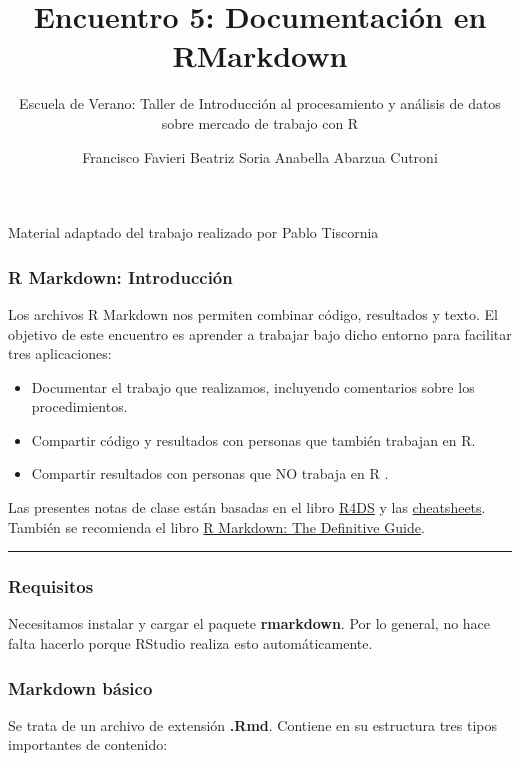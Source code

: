 \documentclass[
]{article}
\title{Encuentro 5: Documentación en RMarkdown}
\subtitle{Escuela de Verano: Taller de Introducción al procesamiento y
análisis de datos sobre mercado de trabajo con R}
\author{Francisco Favieri \textbar{} Beatriz Soria \textbar{} Anabella
Abarzua Cutroni}
\date{}
\providecommand{\tightlist}{%
  \setlength{\itemsep}{0pt}\setlength{\parskip}{0pt}}
\begin{document}
\maketitle

{
\setcounter{tocdepth}{2}
\tableofcontents
}
Material adaptado del trabajo realizado por Pablo Tiscornia

\subsubsection{R Markdown:
Introducción}\label{r-markdown-introducciuxf3n}

Los archivos R Markdown nos permiten combinar código, resultados y
texto. El objetivo de este encuentro es aprender a trabajar bajo dicho
entorno para facilitar tres aplicaciones:

\begin{itemize}
\tightlist
\item
  Documentar el trabajo que realizamos, incluyendo comentarios sobre los
  procedimientos.
\item
  Compartir código y resultados con personas que también trabajan en R.
\item
  Compartir resultados con personas que NO trabaja en R .
\end{itemize}

Las presentes notas de clase están basadas en el libro
\href{https://es.r4ds.hadley.nz/r-markdown.html}{R4DS} y las
\href{https://www.rstudio.com/resources/cheatsheets/}{cheatsheets}.
También se recomienda el libro
\href{https://bookdown.org/yihui/rmarkdown/}{R Markdown: The Definitive
Guide}.

\begin{center}\rule{0.5\linewidth}{0.5pt}\end{center}

\subsubsection{Requisitos}\label{requisitos}

Necesitamos instalar y cargar el paquete \textbf{rmarkdown}. Por lo
general, no hace falta hacerlo porque RStudio realiza esto
automáticamente.

\subsubsection{Markdown básico}\label{markdown-buxe1sico}

Se trata de un archivo de extensión \textbf{.Rmd}. Contiene en su
estructura tres tipos importantes de contenido:
\end{document}
